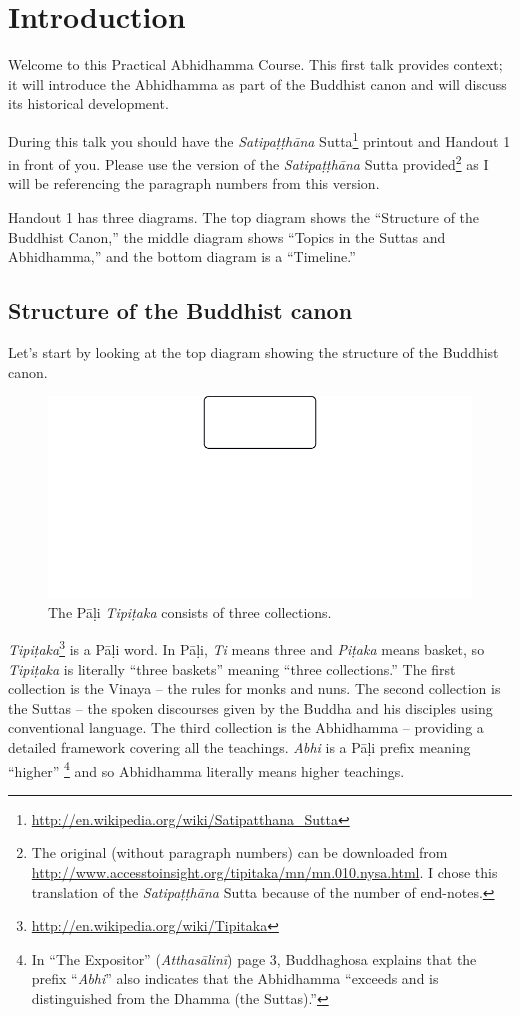 \section{Introduction}

Welcome to this Practical Abhidhamma Course. This first talk provides context; it will introduce the Abhidhamma as part of the Buddhist canon and will discuss its historical development.

During this talk you should have the \textit{Satipaṭṭhāna} Sutta\footnote{\url{http://en.wikipedia.org/wiki/Satipatthana_Sutta}} printout and Handout 1 in front of you. Please use the version of the \textit{Satipaṭṭhāna} Sutta provided\footnote{The original (without paragraph numbers) can be downloaded from \url{http://www.accesstoinsight.org/tipitaka/mn/mn.010.nysa.html}. I chose this translation of the \textit{Satipaṭṭhāna} Sutta because of the number of end-notes.} as I will be referencing the paragraph numbers from this version.

Handout 1 has three diagrams. The top diagram shows the “Structure of the Buddhist Canon,” the middle diagram shows “Topics in the Suttas and Abhidhamma,” and the bottom diagram is a “Timeline.”

\subsection*{Structure of the Buddhist canon}

Let’s start by looking at the top diagram showing the structure of the Buddhist canon.

\begin{figure}[h]
\centering
\includegraphics[width=0.6\linewidth]{./Diagrams/Tipitaka}
\caption{The Pāḷi \textit{Tipiṭaka} consists of three collections.}
\label{fig:Tipitaka}
\end{figure}



\textit{Tipiṭaka}\footnote{\url{http://en.wikipedia.org/wiki/Tipitaka}} is a Pāḷi word. In Pāḷi, \textit{Ti} means three and \textit{Piṭaka} means basket, so \textit{Tipiṭaka} is literally “three baskets” meaning “three collections.” The first collection is the Vinaya – the rules for monks and nuns. The second collection is the Suttas – the spoken discourses given by the Buddha and his disciples using conventional language. The third collection is the Abhidhamma – providing a detailed framework covering all the teachings. \textit{Abhi} is a Pāḷi prefix meaning “higher” \footnote{In “The Expositor” (\textit{Atthasālinī}) page 3, Buddhaghosa explains that the prefix “\textit{Abhi}” also indicates that the Abhidhamma “exceeds and is distinguished from the Dhamma (the Suttas).”} and so Abhidhamma literally means higher teachings.

